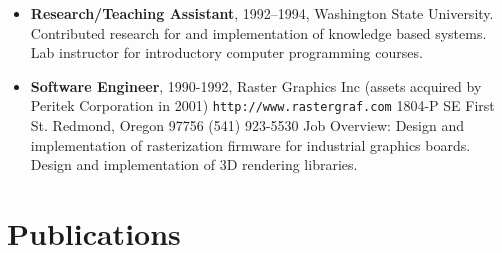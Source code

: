 \documentclass[10pt]{article}
\begin{document}
\begin{itemize}
\item {\bf Research/Teaching Assistant}, 1992--1994, 
Washington State University.
Contributed research for and implementation of knowledge based systems.
Lab instructor for
introductory computer programming courses.

\item {\bf Software Engineer}, 1990-1992,
Raster Graphics Inc
(assets acquired by Peritek Corporation in 2001)
{\tt http://www.rastergraf.com}
1804-P SE First St.
Redmond, Oregon 97756
(541) 923-5530
Job Overview: 
Design and implementation of rasterization firmware for
industrial graphics boards. Design and implementation of
3D rendering libraries.
\end{itemize}

\section*{Publications}
\end{document}
